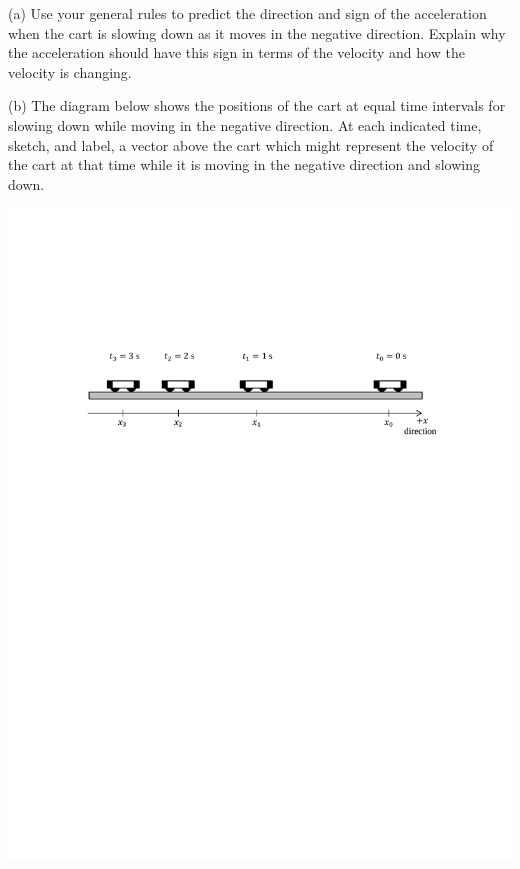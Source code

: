 
(a) Use your general rules to predict the direction and sign of the acceleration
when the cart is slowing down as it moves in the negative direction. Explain why the
acceleration should have this sign in terms of the velocity and how the 
velocity is changing. 
\answerspace{15mm}

(b) The diagram below shows the positions of the cart at equal time intervals
for slowing down while moving in the negative direction. At each indicated time, 
sketch, and label, a vector above the cart which might represent the velocity of the cart at that time while it is moving in the negative direction and slowing down.

{\par\centering \includegraphics{slowing/carts_slowing2.pdf} \par}

